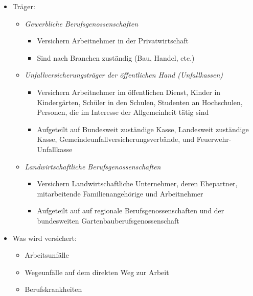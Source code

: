 \documentclass[a4paper, 12pt]{report}
\begin{document}
\begin{itemize}
    \item Träger: 
        \begin{itemize}
            \item \emph{Gewerbliche Berufsgenossenschaften}
                \begin{itemize}
                    \item Versichern Arbeitnehmer in der Privatwirtschaft
                    \item Sind nach Branchen zuständig (Bau, Handel, etc.)
                \end{itemize}
            \item \emph{Unfallversicherungsträger der öffentlichen Hand 
                (Unfallkassen)}
                \begin{itemize}
                    \item Versichern Arbeitnehmer im öffentlichen Dienst, Kinder
                        in Kindergärten, Schüler in den Schulen, Studenten an
                        Hochschulen, Personen, die im Interesse der 
                        Allgemeinheit tätig sind
                    \item Aufgeteilt auf Bundesweit zuständige Kasse, Landesweit
                        zuständige Kasse, Gemeindeunfallversicherungsverbände, 
                        und Feuerwehr-Unfallkasse
                \end{itemize}
            \item \emph{Landwirtschaftliche Berufsgenossenschaften}
                \begin{itemize}
                    \item Versichern Landwirtschaftliche Unternehmer, deren 
                        Ehepartner, mitarbeitende Familienangehörige und 
                        Arbeitnehmer
                    \item Aufgeteilt auf auf regionale Berufsgenossenschaften 
                        und der bundesweiten Gartenbauberufsgenossenschaft
                \end{itemize}
        \end{itemize}
    \item Was wird versichert: 
        \begin{itemize}
            \item Arbeitsunfälle
            \item Wegeunfälle auf dem direkten Weg zur Arbeit
            \item Berufskrankheiten

\end{itemize}
\end{itemize}
\end{document}
